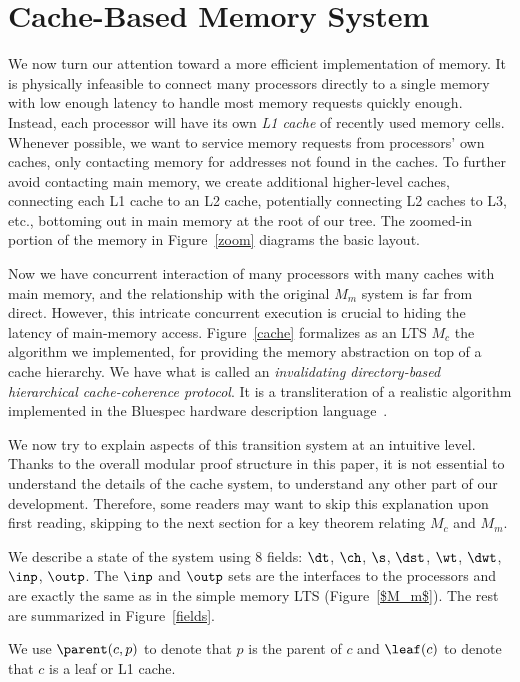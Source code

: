 \section{Cache-Based Memory System}\label{sec:cc}

We now turn our attention toward a more efficient implementation of
memory.  It is physically infeasible to connect many processors
directly to a single memory with low enough latency to handle most
memory requests quickly enough.  Instead, each processor will have its
own \emph{L1 cache} of recently used memory cells.  Whenever possible, we
want to service memory requests from processors' own caches, only
contacting memory for addresses not found in the caches.  To further
avoid contacting main memory, we create additional higher-level
caches, connecting each L1 cache to an L2 cache, potentially
connecting L2 caches to L3, etc., bottoming out in main memory at the
root of our tree. The zoomed-in portion of the memory in Figure~\ref{zoom}
diagrams the basic layout.

Now we have concurrent interaction of many processors with many caches
with main memory, and the relationship with the original $M_m$ system
is far from direct.  However, this intricate concurrent execution is
crucial to hiding the latency of main-memory access.
Figure~\ref{cache} formalizes as an LTS $M_c$ the algorithm we implemented,
for providing the memory abstraction on top of a cache hierarchy.
We have what is called an \emph{invalidating directory-based hierarchical
cache-coherence protocol}.  It is a transliteration of a realistic
algorithm implemented in the Bluespec hardware description
language~\cite{Bluespec:TFRG}. 

We now try to explain aspects of this transition system at an
intuitive level.  Thanks to the overall modular proof structure in
this paper, it is not essential to understand the details of the cache
system, to understand any other part of our development.  Therefore,
some readers may want to skip this explanation upon first reading,
skipping to the next section for a key theorem relating $M_c$ and $M_m$.

We describe a state of the system using 8 fields: $\dt$, $\ch$, $\s$, $\dst$,
$\wt$, $\dwt$, $\inp$, $\outp$. The $\inp$ and $\outp$ sets are the interfaces
to the processors and are exactly the same as in the simple memory LTS
(Figure~\ref{$M_m$}). The rest are summarized in Figure~\ref{fields}.

We use $\parent(c,p)$ to denote that $p$ is the parent of $c$ and $\leaf(c)$ to 
denote that $c$ is a leaf or L1 cache.


